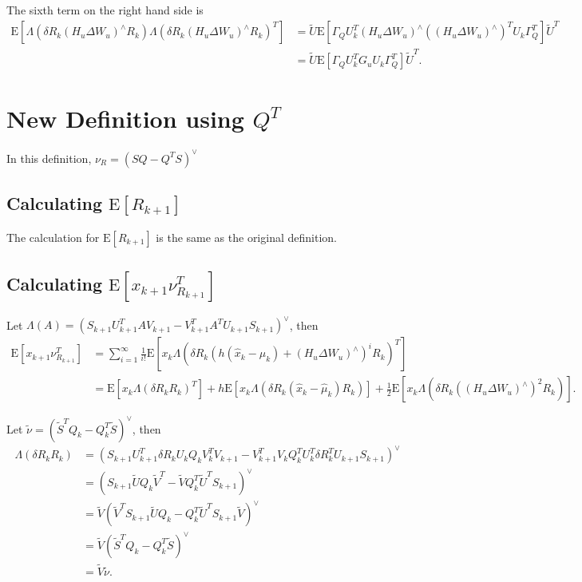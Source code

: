 \documentclass[10pt]{article}
\newcommand{\expect}[1]{\ensuremath{\mathrm{E}\left[ #1 \right]}}
\begin{document}
\noindent The sixth term on the right hand side is
\begin{align*}
	\expect{\Lambda(\delta R_k(H_u\Delta W_u)^\wedge R_k)\Lambda(\delta R_k(H_u\Delta W_u)^\wedge R_k)^T} &= \tilde{U}\expect{\Gamma_QU_k^T(H_u\Delta W_u)^\wedge((H_u\Delta W_u)^\wedge)^TU_k\Gamma_Q^T}\tilde{U}^T \\
	&= \tilde{U}\expect{\Gamma_QU_k^TG_uU_k\Gamma_Q^T}\tilde{U}^T.
\end{align*}

\section{New Definition using $Q^T$}

In this definition, $\nu_R = (SQ-Q^TS)^\vee$

\subsection{Calculating $\expect{R_{k+1}}$}

The calculation for $\expect{R_{k+1}}$ is the same as the original definition.

\subsection{Calculating $\expect{x_{k+1}\nu_{R_{k+1}}^T}$}

Let $\Lambda(A) = (S_{k+1}U_{k+1}^TAV_{k+1} - V_{k+1}^TA^TU_{k+1}S_{k+1})^\vee$, then
\begin{align*}
	\expect{x_{k+1}\nu_{R_{k+1}}^T} &= \sum_{i=1}^\infty \frac{1}{i!} \expect{x_k\Lambda\left( \delta R_k (h(\hat{x}_k-\hat{\mu}_k) + (H_u\Delta W_u)^\wedge)^i R_k \right)^T} \\
	&= \expect{x_k\Lambda(\delta R_kR_k)^T} + h\expect{x_k\Lambda(\delta R_k(\hat{x}_k-\hat{\mu}_k)R_k)} + \frac{1}{2}\expect{x_k\Lambda\left( \delta R_k((H_u\Delta W_u)^\wedge)^2 R_k \right)}.
\end{align*}

\noindent Let $\tilde{\nu} = (\tilde{S}^TQ_k-Q_k^T\tilde{S})^\vee$, then
\begin{align*}
	\Lambda(\delta R_kR_k) &= (S_{k+1}U_{k+1}^T\delta R_kU_kQ_kV_k^TV_{k+1} - V_{k+1}^TV_kQ_k^TU_k^T\delta R_k^TU_{k+1}S_{k+1})^\vee \\
	&= (S_{k+1}\tilde{U}Q_k\tilde{V}^T - \tilde{V}Q_k^T\tilde{U}^TS_{k+1})^\vee \\
	&= \tilde{V}(\tilde{V}^TS_{k+1}\tilde{U}Q_k - Q_k^T\tilde{U}^TS_{k+1}\tilde{V})^\vee \\
	&= \tilde{V}(\tilde{S}^TQ_k - Q_k^T\tilde{S})^\vee \\
	&= \tilde{V}\tilde{\nu}.
\end{align*}
\end{document}

